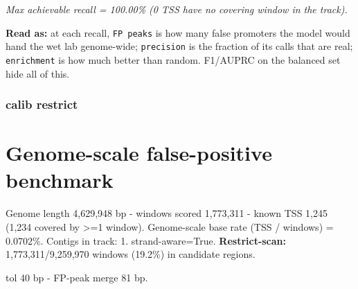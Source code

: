 \documentclass[10pt]{article}
\begin{document}
\begin{center}
\end{center}

{\itshape Max achievable recall = 100.00\% (0 TSS have no covering window in the track).}

\textbf{Read as:} at each recall, \texttt{FP peaks} is how many false promoters the model would hand the wet lab genome-wide; \texttt{precision} is the fraction of its calls that are real; \texttt{enrichment} is how much better than random. F1/AUPRC on the balanced set hide all of this.

\subsubsection*{calib \textperiodcentered{} restrict}
\section*{Genome-scale false-positive benchmark}

Genome length 4,629,948 bp - windows scored 1,773,311 - known TSS 1,245 (1,234 covered by >=1 window). Genome-scale base rate (TSS / windows) = 0.0702\%. Contigs in track: 1. strand-aware=True. \textbf{Restrict-scan:} 1,773,311/9,259,970 windows (19.2\%) in candidate regions.

tol 40 bp - FP-peak merge 81 bp.

\begin{center}
\end{center}
\end{document}
